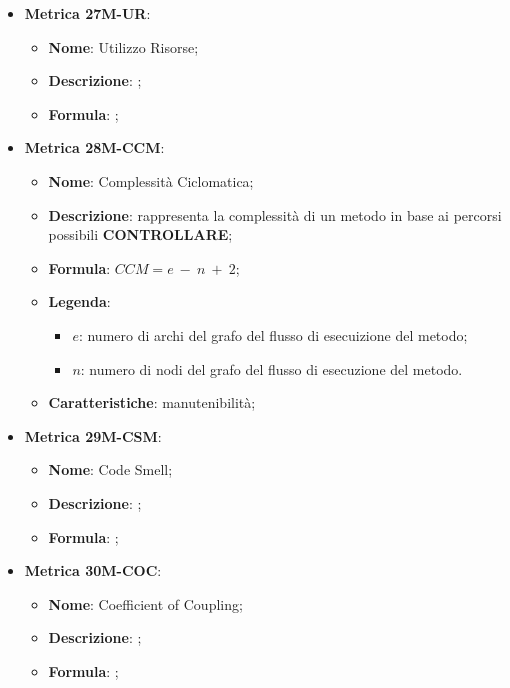 \begin{itemize}
    \item \textbf{Metrica 27M-UR}:
    \begin{itemize}
        \item \textbf{Nome}: Utilizzo Risorse;
        \item \textbf{Descrizione}: ;
        \item \textbf{Formula}: ;
    \end{itemize}
\end{itemize}

\begin{itemize}
    \item \textbf{Metrica 28M-CCM}:
    \begin{itemize}
        \item \textbf{Nome}: Complessità Ciclomatica;
        \item \textbf{Descrizione}: rappresenta la complessità di un metodo in base ai percorsi possibili \textbf{CONTROLLARE};
        \item \textbf{Formula}: $CCM = e\: -\: n\: +\: 2$;
        \item \textbf{Legenda}: 
        \begin{itemize}
            \item $e$: numero di archi del grafo del flusso di esecuizione del metodo;
            \item $n$: numero di nodi del grafo del flusso di esecuzione del metodo.
        \end{itemize}
        \item \textbf{Caratteristiche}: manutenibilità;
    \end{itemize}
\end{itemize}

\begin{itemize}
    \item \textbf{Metrica 29M-CSM}:
    \begin{itemize}
        \item \textbf{Nome}: Code Smell;
        \item \textbf{Descrizione}: ;
        \item \textbf{Formula}: ;
    \end{itemize}
\end{itemize}

\begin{itemize}
    \item \textbf{Metrica 30M-COC}:
    \begin{itemize}
        \item \textbf{Nome}: Coefficient of Coupling;
        \item \textbf{Descrizione}: ;
        \item \textbf{Formula}: ;
    \end{itemize}
\end{itemize}